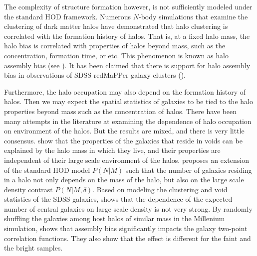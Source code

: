 \documentclass[12pt, preprint]{aastex}
\newcommand{\todo}[1]{{\em \textcolor{red}{ #1}}}
\begin{document}
The complexity of structure formation however, is not sufficiently modeled under the standard HOD framework. Numerous $N$-body simulations that examine the clustering of 
dark matter halos have demonstrated that halo clustering is correlated with the formation 
history of halos. That is, at a fixed halo mass, the halo bias is correlated 
with properties of halos beyond mass, such as the concentration, formation time, or etc. 
This phenomenon is known as halo assembly bias (see \citealt{sheth2004,gao2005, harker2006, weschler2006, gao2007,croton2007,wang2007,angulo2008,dalal2008,li2008,sunayama2016}). It has been claimed that there is support for halo assembly bias in observations of SDSS redMaPPer galaxy clusters (\citealt{miyatake2016}).

Furthermore, the halo occupation may also depend on the formation history of halos. Then we may expect the spatial statistics of galaxies to be tied to the halo properties beyond mass such as the concentration of halos. There have been many attempts in the literature at examining the dependence of halo occupation on environment of the halos. But the results are mixed, and there is very little consensus. \citet{tinker_void_2009} show that the properties of the galaxies that reside in voids can be explained by the halo mass in which they live, and their properties are independent of their large scale environment of the halos. \citet{tinker_density_hod} proposes an extension of the standard HOD model $P(N|M)$ such that the number of galaxies residing in a halo not only depends on the mass of the halo, but also on the large scale density contrast $P(N|M,\delta)$. Based on modeling the clustering and void statistics of the SDSS galaxies, \citet{edHOD-tinker} shows that the dependence of the expected number of central galaxies on large scale density is not very strong.    
By randomly shuffling the galaxies among host halos of similar mass in the Millenium simulation, \citet{croton2007} shows that assembly bias significantly impacts the galaxy two-point correlation functions. They also show that the effect is different for the faint and the bright samples.

\end{document}
